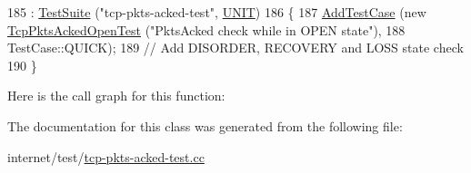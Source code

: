 \begin{DoxyCode}
185                            : \hyperlink{classns3_1_1TestSuite_a904b0c40583b744d30908aeb94636d1a}{TestSuite} (\textcolor{stringliteral}{"tcp-pkts-acked-test"}, \hyperlink{classns3_1_1TestSuite_a1ebfcab34ec8161e085e8e3a1855eae0a3885375a3787abf60431f8454b3cadbd}{UNIT})
186   \{
187     \hyperlink{classns3_1_1TestCase_a3718088e3eefd5d6454569d2e0ddd835}{AddTestCase} (\textcolor{keyword}{new} \hyperlink{classTcpPktsAckedOpenTest}{TcpPktsAckedOpenTest} (\textcolor{stringliteral}{"PktsAcked check while in OPEN
       state"}),
188                  TestCase::QUICK);
189     \textcolor{comment}{// Add DISORDER, RECOVERY and LOSS state check}
190   \}
\end{DoxyCode}


Here is the call graph for this function\+:




The documentation for this class was generated from the following file\+:\begin{DoxyCompactItemize}
\item 
internet/test/\hyperlink{tcp-pkts-acked-test_8cc}{tcp-\/pkts-\/acked-\/test.\+cc}\end{DoxyCompactItemize}
